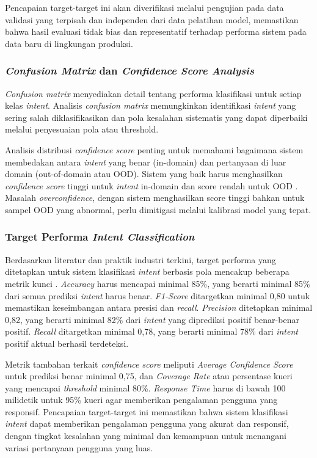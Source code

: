 Pencapaian target-target ini akan diverifikasi melalui pengujian pada data validasi yang terpisah dan independen dari data pelatihan model, memastikan bahwa hasil evaluasi tidak bias dan representatif terhadap performa sistem pada data baru di lingkungan produksi.

\subsubsection{\textit{Confusion Matrix} dan \textit{Confidence Score Analysis}}

\textit{Confusion matrix} menyediakan detail tentang performa klasifikasi untuk setiap kelas \textit{intent}. Analisis \textit{confusion matrix} memungkinkan identifikasi \textit{intent} yang sering salah diklasifikasikan dan pola kesalahan sistematis yang dapat diperbaiki melalui penyesuaian pola atau threshold.

Analisis distribusi \textit{confidence score} penting untuk memahami bagaimana sistem membedakan antara \textit{intent} yang benar (in-domain) dan pertanyaan di luar domain (out-of-domain atau OOD). Sistem yang baik harus menghasilkan \textit{confidence score} tinggi untuk \textit{intent} in-domain dan score rendah untuk OOD \autocite{khosla2022evaluating,zhang2022disentangling}. Masalah \textit{overconfidence}, dengan sistem menghasilkan score tinggi bahkan untuk sampel OOD yang abnormal, perlu dimitigasi melalui kalibrasi model yang tepat.

\subsubsection{Target Performa \textit{Intent Classification}}

Berdasarkan literatur dan praktik industri terkini, target performa yang ditetapkan untuk sistem klasifikasi \textit{intent} berbasis pola mencakup beberapa metrik kunci \autocite{spotintelligence2023intent,svm2025comparative}. \textit{Accuracy} harus mencapai minimal 85\%, yang berarti minimal 85\% dari semua prediksi \textit{intent} harus benar. \textit{F1-Score} ditargetkan minimal 0,80 untuk memastikan keseimbangan antara presisi dan \textit{recall}. \textit{Precision} ditetapkan minimal 0,82, yang berarti minimal 82\% dari \textit{intent} yang diprediksi positif benar-benar positif. \textit{Recall} ditargetkan minimal 0,78, yang berarti minimal 78\% dari \textit{intent} positif aktual berhasil terdeteksi.

Metrik tambahan terkait \textit{confidence score} meliputi \textit{Average Confidence Score} untuk prediksi benar minimal 0,75, dan \textit{Coverage Rate} atau persentase kueri yang mencapai \textit{threshold} minimal 80\%. \textit{Response Time} harus di bawah 100 milidetik untuk 95\% kueri agar memberikan pengalaman pengguna yang responsif. Pencapaian target-target ini memastikan bahwa sistem klasifikasi \textit{intent} dapat memberikan pengalaman pengguna yang akurat dan responsif, dengan tingkat kesalahan yang minimal dan kemampuan untuk menangani variasi pertanyaan pengguna yang luas.

